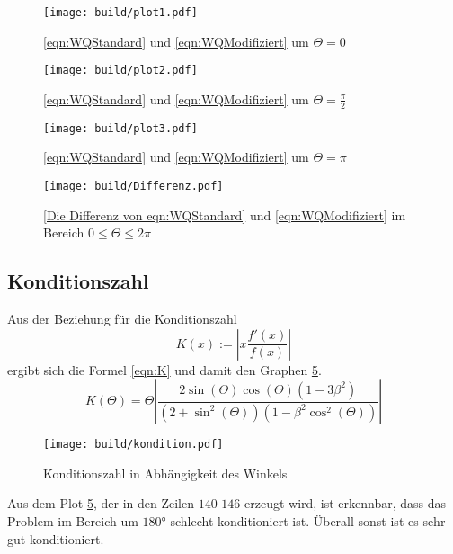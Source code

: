 \begin{figure}
  \centering
  \texttt{[image: build/plot1.pdf]}
  \caption{\eqref{eqn:WQStandard} und \eqref{eqn:WQModifiziert} um $\Theta = 0$}
  \label{fig:t0}
\end{figure}

\begin{figure}
  \centering
  \texttt{[image: build/plot2.pdf]}
  \caption{\eqref{eqn:WQStandard} und \eqref{eqn:WQModifiziert} um $\Theta = \frac{\pi}{2}$}
  \label{fig:tpi2}
\end{figure}

\begin{figure}
  \centering
  \texttt{[image: build/plot3.pdf]}
  \caption{\eqref{eqn:WQStandard} und \eqref{eqn:WQModifiziert} um $\Theta = \pi$}
  \label{fig:tpi}
\end{figure}

\begin{figure}
  \centering
  \texttt{[image: build/Differenz.pdf]}
  \caption{\eqref{Die Differenz von eqn:WQStandard} und \eqref{eqn:WQModifiziert} im Bereich $0 \leq \Theta \leq 2\pi$}
  \label{fig:Abweichung}
\end{figure}

\newpage

\subsection{Konditionszahl}
Aus der Beziehung für die Konditionszahl
\begin{equation}
  K(x):=\left|x\frac{f'(x)}{f(x)}\right|
\end{equation}
ergibt sich die Formel \eqref{eqn:K} und damit den Graphen \ref{fig:kondition}.
\begin{equation}
  K(\Theta)= \Theta  \left|\frac{2\sin(\Theta)\cos(\Theta)\left(1-3\beta^2\right)}{\left(2+\sin^2(\Theta)\right)\left(1-\beta^2\cos^2(\Theta)\right)}\right| \label{eqn:K}
\end{equation}

\begin{figure}
  \centering
  \texttt{[image: build/kondition.pdf]}
  \caption{Konditionszahl in Abhängigkeit des Winkels}
  \label{fig:kondition}
\end{figure}
\noindent Aus dem Plot \ref{fig:kondition}, der in den Zeilen $140$-$146$ erzeugt wird, ist erkennbar, dass das Problem im Bereich um $180\si{\degree}$ schlecht konditioniert ist.
Überall sonst ist es sehr gut konditioniert.





